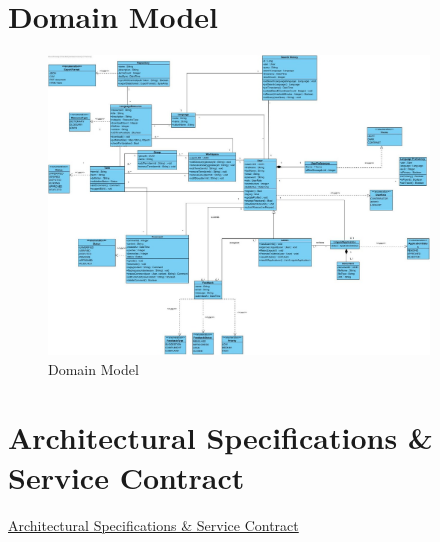 \documentclass[12pt]{article}
\begin{document}
\section{Domain Model}
\begin{figure}[H]
  \centering
  \includegraphics[width=0.9\textwidth]{domain_model_V1.1.0.jpg}
  \caption{Domain Model}
  \label{fig:domain-model}
\end{figure}

\section{Architectural Specifications \& Service Contract}
    \href{https://github.com/COS301-SE-2025/Marito/blob/develop/Documentation/System%20Requirements/Architectural_Specifications_v4.pdf}{Architectural Specifications \& Service Contract}
\end{document}
